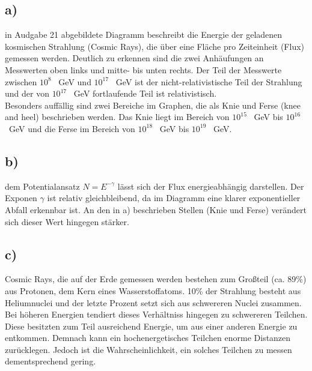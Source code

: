 \subsection{a)}

    \justifying in Audgabe 21 abgebildete Diagramm beschreibt die Energie der geladenen kosmischen Strahlung (Cosmic Rays), die über eine Fläche pro Zeiteinheit (Flux)
    gemessen werden. Deutlich zu erkennen sind die zwei Anhäufungen an Messwerten oben links und mitte- bis unten rechts. Der Teil der Messwerte zwischen $10^{8}$ \SI{}{\giga\electronvolt}
    und $10^{17}$ \SI{}{\giga\electronvolt} ist der nicht-relativistische Teil der Strahlung und der von $10^{17}$ \SI{}{\giga\electronvolt} fortlaufende Teil ist relativistisch.\\
    Besonders auffällig sind zwei Bereiche im Graphen, die als Knie und Ferse (knee and heel) beschrieben werden. Das Knie liegt im Bereich von $10^{15}$ \SI{}{\giga\electronvolt}
    bis $10^{16}$ \SI{}{\giga\electronvolt} und die Ferse im Bereich von $10^{18}$ \SI{}{\giga\electronvolt} bis $10^{19}$ \SI{}{\giga\electronvolt}.

\subsection{b)}

    \justifying dem Potentialansatz $N=E^{-\gamma}$ lässt sich der Flux energieabhängig darstellen. Der Exponen $\gamma$ ist relativ gleichbleibend, da im Diagramm
    eine klarer exponentieller Abfall erkennbar ist. An den in a) beschrieben Stellen (Knie und Ferse) verändert sich dieser Wert hingegen stärker.

\subsection{c)}

    \justifying Cosmic Rays, die auf der Erde gemessen werden bestehen zum Großteil (ca. 89\%) aus Protonen, dem Kern eines Wasserstoffatoms. 10\% der Strahlung 
    besteht aus Heliumnuclei und der letzte Prozent setzt sich aus schwereren Nuclei zusammen. 
    Bei höheren Energien tendiert dieses Verhältniss hingegen zu schwereren Teilchen. Diese besitzten zum Teil ausreichend Energie, um aus einer anderen Energie zu entkommen. Demnach 
    kann ein hochenergetisches Teilchen enorme Distanzen zurücklegen. Jedoch ist die Wahrscheinlichkeit, ein solches Teilchen zu messen dementsprechend gering. 

